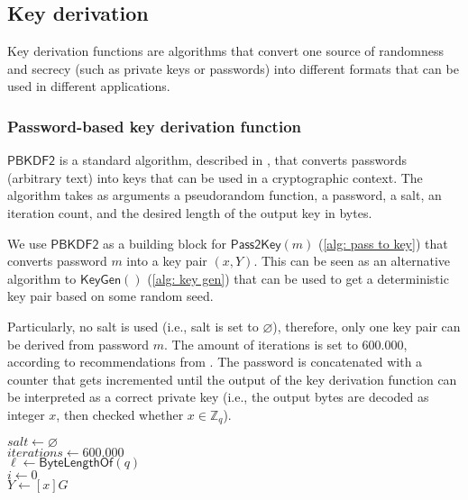 \clearpage
\subsection{Key derivation} \label{app: key derivation}
Key derivation functions are algorithms that convert one source of randomness and secrecy (such as private keys or passwords) into different formats that can be used in different applications.


\subsubsection{Password-based key derivation function} \label{app: password-based key derivation function}
$\mathsf{PBKDF2}$ is a standard algorithm, described in \cite{RFC8018}, that converts passwords (arbitrary text) into keys that can be used in a cryptographic context. The algorithm takes as arguments a pseudorandom function, a password, a salt, an iteration count, and the desired length of the output key in bytes.

We use $\mathsf{PBKDF2}$ as a building block for $\mathsf{Pass2Key}(m)$ (\cref{alg: pass to key}) that converts password $m$ into a key pair $(x, Y)$. This can be seen as an alternative algorithm to $\mathsf{KeyGen}()$ (\cref{alg: key gen}) that can be used to get a deterministic key pair based on some random seed.

Particularly, no salt is used (i.e., salt is set to $\varnothing$), therefore, only one key pair can be derived from password $m$. The amount of iterations is set to 600.000, according to recommendations from \cite{OWASP}. The password is concatenated with a counter that gets incremented until the output of the key derivation function can be interpreted as a correct private key (i.e., the output bytes are decoded as integer $x$, then checked whether $x \in \mathbb{Z}_q$).

\begin{algorithm}[ht]
    \DontPrintSemicolon
    \caption{$\mathsf{Pass2Key}(m)$}
    \label{alg: pass to key}
    
    $salt \gets \varnothing$ \\
    $iterations \gets 600.000$ \\
    $\ell \gets \mathsf{ByteLengthOf}(q)$ \\
    $i \gets 0$ \\
    $Y \gets [x]G$ \\
     
\end{algorithm}


